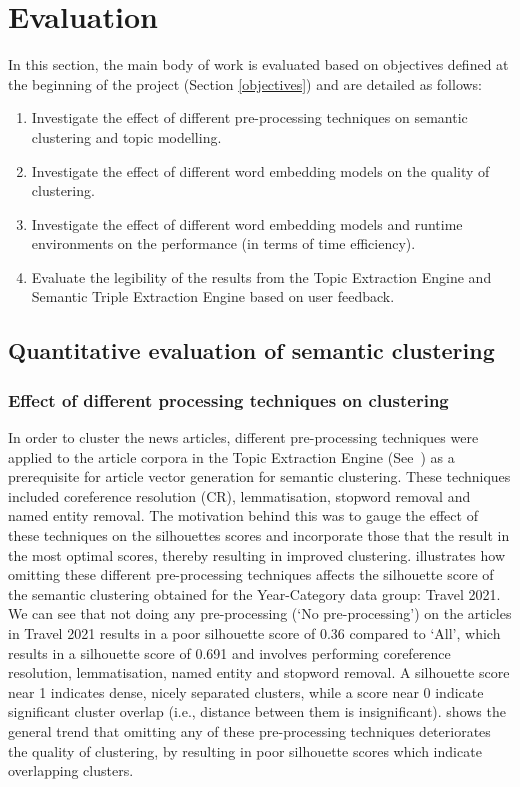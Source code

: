 \chapter{Evaluation}   \label{ch:6:eval}

In this section, the main body of work is evaluated based on objectives defined at the beginning of the project (Section \ref{objectives}) and are detailed as follows:
\begin{enumerate}
    \item Investigate the effect of different pre-processing techniques on semantic clustering and topic modelling.
    \item Investigate the effect of different word embedding models on the quality of clustering.
    \item Investigate the effect of different word embedding models and runtime environments on the performance (in terms of time efficiency).
    \item Evaluate the legibility of the results from the Topic Extraction Engine and Semantic Triple Extraction Engine based on user feedback.
\end{enumerate}

\section{Quantitative evaluation of semantic clustering} \label{s:evaluation_semantic_clustering}

\subsection{Effect of different processing techniques on clustering} \label{s:preprocess_clustering}

In order to cluster the news articles, different pre-processing techniques were applied to the article corpora in the Topic Extraction Engine (See~) as a prerequisite for article vector generation for semantic clustering. These techniques included coreference resolution (CR), lemmatisation, stopword removal and named entity removal. The motivation behind this was to gauge the effect of these techniques on the silhouettes scores and incorporate those that the result in the most optimal scores, thereby resulting in improved clustering.  illustrates how omitting these different pre-processing techniques affects the silhouette score of the semantic clustering obtained for the Year-Category data group: Travel 2021. We can see that not doing any pre-processing (`No pre-processing') on the articles in Travel 2021 results in a poor silhouette score of 0.36 compared to `All', which results in a silhouette score of 0.691 and involves performing coreference resolution, lemmatisation, named entity and stopword removal. A silhouette score near 1 indicates dense, nicely separated clusters, while a score near 0 indicate significant cluster overlap (i.e., distance between them is insignificant).  shows the general trend that omitting any of these pre-processing techniques deteriorates the quality of clustering, by resulting in poor silhouette scores which indicate overlapping clusters.

